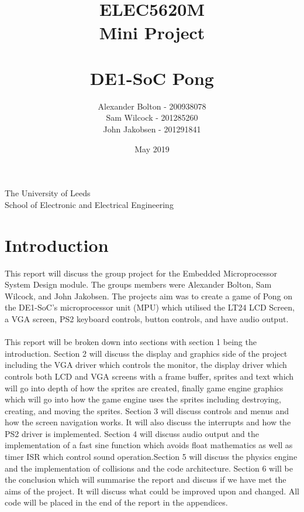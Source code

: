 \documentclass[a4paper,12pt]{article}
\begin{document}
\title{\\ \textbf{ELEC5620M \\ Mini Project \\ \- \\ DE1-SoC Pong }}
\author{Alexander Bolton - 200938078 \\ Sam Wilcock - 201285260\\ John Jakobsen - 201291841}
\date{May 2019}
\maketitle
\thispagestyle{empty}
\begin{center}

\end{center}
\vfill
\begin{center}
The University of Leeds \\  School of Electronic and Electrical Engineering
\end{center}

\newpage

\tableofcontents
\thispagestyle{empty}

\newpage 
{}
\section{Introduction}
\begin{flushleft}
This report will discuss the group project for the Embedded Microprocessor System Design module. The groups members were Alexander Bolton, Sam Wilcock, and John Jakobsen. The projects aim was to create a game of Pong on the DE1-SoC's microprocessor unit (MPU) which utilised the LT24 LCD Screen, a VGA screen, PS2 keyboard controls, button controls, and have audio output.
\\ \- \\
This report will be broken down into sections with section 1 being the introduction. Section 2 will discuss the display and graphics side of the project including the VGA driver which controls the monitor, the display driver which controls both LCD and VGA screens with a frame buffer, sprites and text which will go into depth of how the sprites are created, finally game engine graphics which will go into how the game engine uses the sprites including destroying, creating, and moving the sprites. Section 3 will discuss controls and menus and how the screen navigation works. It will also discuss the interrupts and how the PS2 driver is implemented. Section 4 will discuss audio output and the implementation of a fast sine function which avoids float mathematics as well as timer ISR which control sound operation.Section 5 will discuss the physics engine and the implementation of collisions and the code architecture. Section 6 will be the conclusion which will summarise the report and discuss if we have met the aims of the project. It will discuss what could be improved upon and changed. All code will be placed in the end of the report in the appendices. 
\end{flushleft}
\newpage
\end{document}
